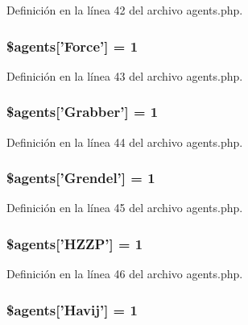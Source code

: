 Definición en la línea 42 del archivo agents.\-php.

\hypertarget{agents_8php_a16fffac3d9ff0c07bc6e7fc2b9341a6a}{
\subsubsection[{\$agents}]{\setlength{\rightskip}{0pt plus 5cm}\$agents\mbox{[}'Force'\mbox{]} = 1}}\label{agents_8php_a16fffac3d9ff0c07bc6e7fc2b9341a6a}


Definición en la línea 43 del archivo agents.\-php.

\hypertarget{agents_8php_a3adfd5c4288f1ab23258d5aeadabc997}{
\subsubsection[{\$agents}]{\setlength{\rightskip}{0pt plus 5cm}\$agents\mbox{[}'Grabber'\mbox{]} = 1}}\label{agents_8php_a3adfd5c4288f1ab23258d5aeadabc997}


Definición en la línea 44 del archivo agents.\-php.

\hypertarget{agents_8php_abae967f09c596314df81b9d9cf675ad6}{
\subsubsection[{\$agents}]{\setlength{\rightskip}{0pt plus 5cm}\$agents\mbox{[}'Grendel'\mbox{]} = 1}}\label{agents_8php_abae967f09c596314df81b9d9cf675ad6}


Definición en la línea 45 del archivo agents.\-php.

\hypertarget{agents_8php_adacd9d73c550e2fea90bdfbe8ac3dc8d}{
\subsubsection[{\$agents}]{\setlength{\rightskip}{0pt plus 5cm}\$agents\mbox{[}'H\-Z\-Z\-P'\mbox{]} = 1}}\label{agents_8php_adacd9d73c550e2fea90bdfbe8ac3dc8d}


Definición en la línea 46 del archivo agents.\-php.

\hypertarget{agents_8php_ace103c6735950e74d94c6d96c0e9972c}{
\subsubsection[{\$agents}]{\setlength{\rightskip}{0pt plus 5cm}\$agents\mbox{[}'Havij'\mbox{]} = 1}}\label{agents_8php_ace103c6735950e74d94c6d96c0e9972c}


